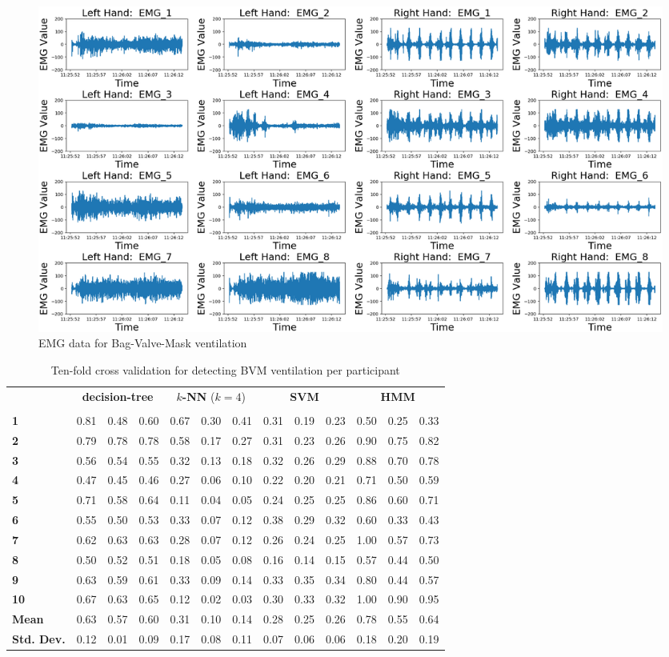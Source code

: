 \begin{figure}
	\centering
	\includegraphics[width=0.8\linewidth]{pictures/7073_EMG_Day3_b_46}
	\caption{EMG data for Bag-Valve-Mask ventilation}
	\label{fig:7073emgday3b46}
\end{figure}
\begin{table}[]
	\centering
	\begin{tabular}{lllllllllllll}
		\multirow{2}{*}{\rotatebox[origin=c]{45}{\textbf{Participant}}}& \multicolumn{3}{c}{\textbf{decision-tree}} & \multicolumn{3}{c}{\textbf{$k$-NN} ($k=4$)} & \multicolumn{3}{c}{\textbf{SVM}} & \multicolumn{3}{c}{\textbf{HMM}} \\
		 & \rot{Precision}     & \rot{Recall}    & \rot{F1}    & \rot{Precision}     & \rot{Recall}    & \rot{F1}  & \rot{Precision}     & \rot{Recall}    & \rot{F1} & \rot{Precision}     & \rot{Recall}    & \rot{F1} \\
		\textbf{1}   & 0.81 & 0.48 & 0.60 & 0.67 & 0.30 & 0.41 & 0.31 & 0.19 & 0.23 & 0.50 & 0.25 & 0.33 \\
		\textbf{2}   & 0.79 & 0.78 & 0.78 & 0.58 & 0.17 & 0.27 & 0.31 & 0.23 & 0.26 & 0.90 & 0.75 & 0.82 \\
		\textbf{3}   & 0.56 & 0.54 & 0.55 & 0.32 & 0.13 & 0.18 & 0.32 & 0.26 & 0.29 & 0.88 & 0.70 & 0.78 \\
		\textbf{4}   & 0.47 & 0.45 & 0.46 & 0.27 & 0.06 & 0.10 & 0.22 & 0.20 & 0.21 & 0.71 & 0.50 & 0.59 \\
		\textbf{5}   & 0.71 & 0.58 & 0.64 & 0.11 & 0.04 & 0.05 & 0.24 & 0.25 & 0.25 & 0.86 & 0.60 & 0.71 \\
		\textbf{6}   & 0.55 & 0.50 & 0.53 & 0.33 & 0.07 & 0.12 & 0.38 & 0.29 & 0.32 & 0.60 & 0.33 & 0.43 \\
		\textbf{7}   & 0.62 & 0.63 & 0.63 & 0.28 & 0.07 & 0.12 & 0.26 & 0.24 & 0.25 & 1.00 & 0.57 & 0.73 \\
		\textbf{8}   & 0.50 & 0.52 & 0.51 & 0.18 & 0.05 & 0.08 & 0.16 & 0.14 & 0.15 & 0.57 & 0.44 & 0.50 \\
		\textbf{9}   & 0.63 & 0.59 & 0.61 & 0.33 & 0.09 & 0.14 & 0.33 & 0.35 & 0.34 & 0.80 & 0.44 & 0.57 \\
		\textbf{10} & 0.67 & 0.63 & 0.65 & 0.12 & 0.02 & 0.03 & 0.30 & 0.33 & 0.32 & 1.00 & 0.90 & 0.95 \\
		\hline
		\textbf{Mean} & 0.63 & 0.57 & 0.60 & 0.31 & 0.10 & 0.14 & 0.28 & 0.25 & 0.26 & 0.78 & 0.55 & 0.64 \\
		\textbf{Std. Dev.} & 0.12 & 0.01 & 0.09 & 0.17 & 0.08 & 0.11 & 0.07 & 0.06 & 0.06 & 0.18 & 0.20 & 0.19
	\end{tabular}
	\caption{Ten-fold cross validation for detecting BVM ventilation per participant}
	\label{tab:bvm:ml}
\end{table}
